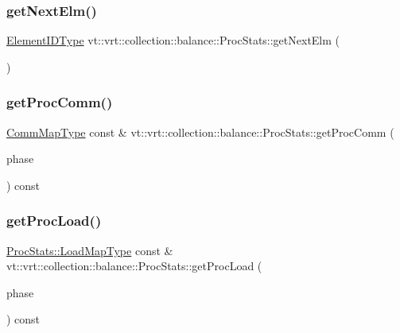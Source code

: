 \subsubsection{\texorpdfstring{get\+Next\+Elm()}{getNextElm()}}
{\footnotesize\ttfamily \hyperlink{namespacevt_1_1vrt_1_1collection_1_1balance_a14c8d2c972f2913aa3f1636e5be0a120}{Element\+I\+D\+Type} vt\+::vrt\+::collection\+::balance\+::\+Proc\+Stats\+::get\+Next\+Elm (\begin{DoxyParamCaption}{ }\end{DoxyParamCaption})}

\mbox{\label{structvt_1_1vrt_1_1collection_1_1balance_1_1_proc_stats_ad8cda5635a21134657595fd34dca1f6a}} 
\subsubsection{\texorpdfstring{get\+Proc\+Comm()}{getProcComm()}}
{\footnotesize\ttfamily \hyperlink{namespacevt_1_1vrt_1_1collection_1_1balance_aa50d4cbbfa3c643e7303fc6e08f411fb}{Comm\+Map\+Type} const  \& vt\+::vrt\+::collection\+::balance\+::\+Proc\+Stats\+::get\+Proc\+Comm (\begin{DoxyParamCaption}\item[{\hyperlink{namespacevt_a46ce6733d5cdbd735d561b7b4029f6d7}{Phase\+Type}}]{phase }\end{DoxyParamCaption}) const}

\mbox{\label{structvt_1_1vrt_1_1collection_1_1balance_1_1_proc_stats_a58efd15cd33db3c5ce9ba8677feb486b}} 
\subsubsection{\texorpdfstring{get\+Proc\+Load()}{getProcLoad()}}
{\footnotesize\ttfamily \hyperlink{structvt_1_1vrt_1_1collection_1_1balance_1_1_proc_stats_aa810fd21680061ec5d50f6526f66be31}{Proc\+Stats\+::\+Load\+Map\+Type} const  \& vt\+::vrt\+::collection\+::balance\+::\+Proc\+Stats\+::get\+Proc\+Load (\begin{DoxyParamCaption}\item[{\hyperlink{namespacevt_a46ce6733d5cdbd735d561b7b4029f6d7}{Phase\+Type}}]{phase }\end{DoxyParamCaption}) const}

